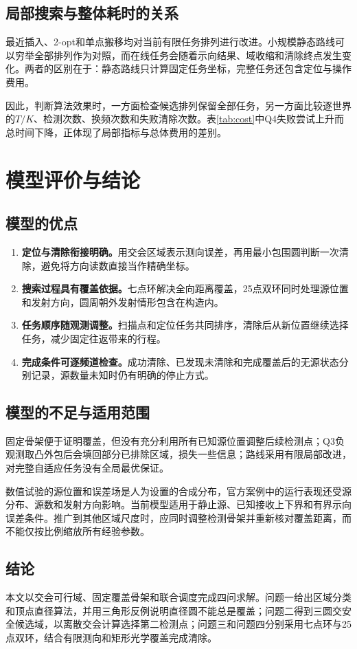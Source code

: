 \documentclass[UTF8,fontset=fandol,a4paper,zihao=-4]{ctexart}
\begin{document}
\subsection{局部搜索与整体耗时的关系}
最近插入、2-opt和单点搬移均对当前有限任务排列进行改进。小规模静态路线可以穷举全部排列作为对照，而在线任务会随着示向结果、域收缩和清除终点发生变化。两者的区别在于：静态路线只计算固定任务坐标，完整任务还包含定位与操作费用。

因此，判断算法效果时，一方面检查候选排列保留全部任务，另一方面比较逐世界的$T/K$、检测次数、换频次数和失败清除次数。表\ref{tab:cost}中Q4失败尝试上升而总时间下降，正体现了局部指标与总体费用的差别。

\section{模型评价与结论}
\subsection{模型的优点}
\begin{enumerate}
\item \textbf{定位与清除衔接明确。}用交会区域表示测向误差，再用最小包围圆判断一次清除，避免将方向读数直接当作精确坐标。
\item \textbf{搜索过程具有覆盖依据。}七点环解决全向距离覆盖，25点双环同时处理源位置和发射方向，圆周朝外发射情形包含在构造内。
\item \textbf{任务顺序随观测调整。}扫描点和定位任务共同排序，清除后从新位置继续选择任务，减少固定往返带来的行程。
\item \textbf{完成条件可逐频道检查。}成功清除、已发现未清除和完成覆盖后的无源状态分别记录，源数量未知时仍有明确的停止方式。
\end{enumerate}

\subsection{模型的不足与适用范围}
固定骨架便于证明覆盖，但没有充分利用所有已知源位置调整后续检测点；Q3负观测取凸外包后会填回部分已排除区域，损失一些信息；路线采用有限局部改进，对完整自适应任务没有全局最优保证。

数值试验的源位置和误差场是人为设置的合成分布，官方案例中的运行表现还受源分布、源数和发射方向影响。当前模型适用于静止源、已知接收上下界和有界示向误差条件。推广到其他区域尺度时，应同时调整检测骨架并重新核对覆盖距离，而不能仅按比例缩放所有经验参数。

\subsection{结论}
本文以交会可行域、固定覆盖骨架和联合调度完成四问求解。问题一给出区域分类和顶点直径算法，并用三角形反例说明直径圆不能总是覆盖；问题二得到三圆交安全候选域，以离散交会计算选择第二检测点；问题三和问题四分别采用七点环与25点双环，结合有限测向和矩形光学覆盖完成清除。
\end{document}
